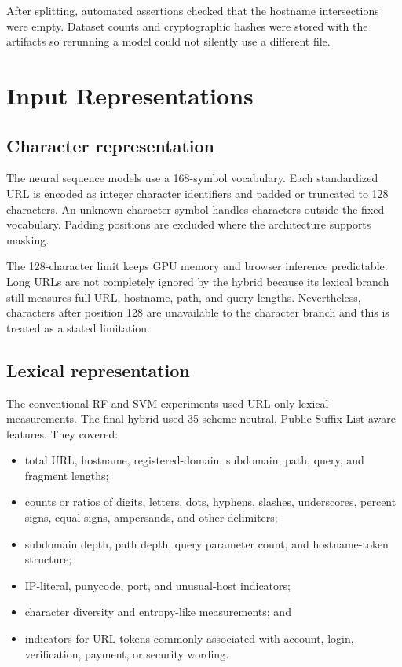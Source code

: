 After splitting, automated assertions checked that the hostname intersections
were empty. Dataset counts and cryptographic hashes were stored with the
artifacts so rerunning a model could not silently use a different file.

\section{Input Representations}

\subsection{Character representation}

The neural sequence models use a 168-symbol vocabulary. Each standardized URL
is encoded as integer character identifiers and padded or truncated to 128
characters. An unknown-character symbol handles characters outside the fixed
vocabulary. Padding positions are excluded where the architecture supports
masking.

The 128-character limit keeps GPU memory and browser inference predictable.
Long URLs are not completely ignored by the hybrid because its lexical branch
still measures full URL, hostname, path, and query lengths. Nevertheless,
characters after position 128 are unavailable to the character branch and this
is treated as a stated limitation.

\subsection{Lexical representation}

The conventional RF and SVM experiments used URL-only lexical measurements.
The final hybrid used 35 scheme-neutral, Public-Suffix-List-aware features.
They covered:

\begin{itemize}
    \item total URL, hostname, registered-domain, subdomain, path, query, and
    fragment lengths;
    \item counts or ratios of digits, letters, dots, hyphens, slashes,
    underscores, percent signs, equal signs, ampersands, and other delimiters;
    \item subdomain depth, path depth, query parameter count, and hostname-token
    structure;
    \item IP-literal, punycode, port, and unusual-host indicators;
    \item character diversity and entropy-like measurements; and
    \item indicators for URL tokens commonly associated with account, login,
    verification, payment, or security wording.
\end{itemize}

